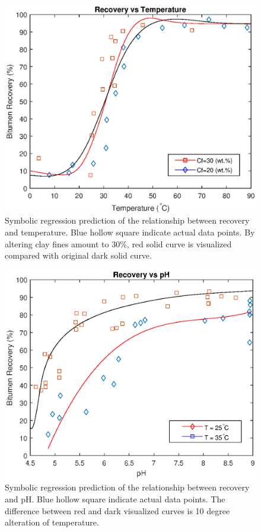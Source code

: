 \documentclass[final,5p,times,twocolumn]{elsarticle}
\begin{document}
\begin{figure}[!hptb]
	\centering
	\includegraphics[width=\linewidth,clip]{T_comparison.eps}
	\vspace{-2em}
	\caption{Symbolic regression prediction of the relationship between recovery and temperature. Blue hollow square indicate actual data points. By altering clay fines amount to 30\%, red solid curve is visualized compared with original dark solid curve.}
	\label{t_comparison}
\end{figure}
\begin{figure}[!hptb]
	\centering
	\includegraphics[width=\linewidth,clip]{ph_comparison.eps}
	\vspace{-2em}
	\caption{Symbolic regression prediction of the relationship between recovery and pH. Blue hollow square indicate actual data points. The difference between red and dark visualized curves is 10 degree alteration of temperature.}
	\label{ph_comparison}
\end{figure}
\end{document}
